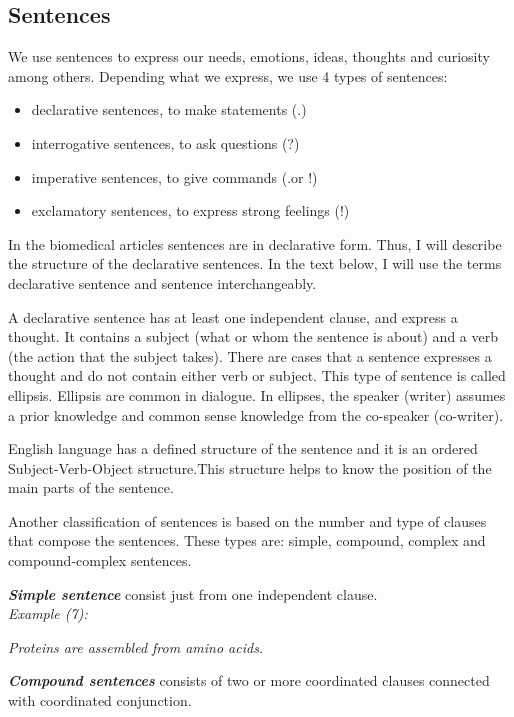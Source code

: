 \subsection{Sentences}

We use sentences to express our needs, emotions, ideas, thoughts and curiosity among others. Depending what we express, we use 4 types of sentences:
\begin{itemize}
	\item declarative sentences, to make statements (.)
	\item interrogative sentences, to ask questions (?)
	\item imperative sentences, to give commands (.or !)
	\item exclamatory sentences, to express strong feelings (!)
\end{itemize}

In the biomedical articles sentences are in declarative form. Thus, I will describe the structure of the declarative sentences. In the text below, I will use the terms declarative sentence and sentence interchangeably.

A declarative sentence has at least one independent clause, and express a thought. It contains a subject (what or whom the sentence is about) and a verb (the action that the subject takes). There are cases that a sentence expresses a thought and do not contain either verb or subject. This type of sentence is called ellipsis. Ellipsis are common in dialogue. In ellipses, the speaker (writer) assumes a prior knowledge and common sense knowledge from the co-speaker (co-writer).

English language has a defined structure of the sentence and it is an ordered Subject-Verb-Object structure.This structure helps to know the position of the main parts of the sentence.

Another classification of sentences is based on the number and type of clauses that compose the sentences. These types are: simple, compound, complex and compound-complex sentences.

\emph{\textbf{Simple sentence}} consist just from one independent clause.\\

\emph{Example (7):}
\begin{changemargin}{10mm}{10mm}
   \emph{Proteins are assembled from amino acids.}
\end{changemargin}
\vspace{3mm}

\emph{\textbf{Compound sentences}} consists of two or more coordinated clauses connected with coordinated conjunction.\\

